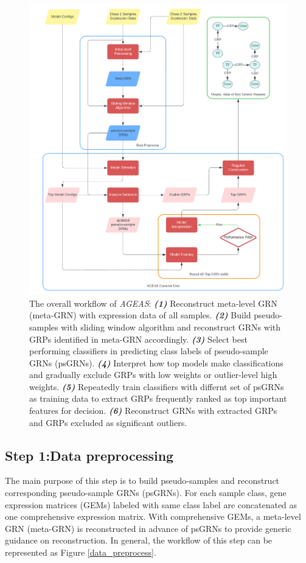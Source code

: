 \documentclass[fleqn,10pt]{wlscirep}
\begin{document}
  \begin{figure}[ht]
  \centering
  \includegraphics[width=0.8\linewidth, keepaspectratio,]{../images/summary_trans.png}
  \caption{
    The overall workflow of \emph{AGEAS}:
    \textbf{\emph{(1)}} Reconstruct meta-level GRN (meta-GRN) with expression data of all samples.
    \textbf{\emph{(2)}} Build pseudo-samples with sliding window algorithm and reconstruct GRNs with GRPs identified in meta-GRN accordingly.
    \textbf{\emph{(3)}} Select best performing classifiers in predicting class labels of pseudo-sample GRNs (psGRNs).
    \textbf{\emph{(4)}} Interpret how top models make classifications and gradually exclude GRPs with low weights or outlier-level high weights.
    \textbf{\emph{(5)}} Repeatedly train classifiers with differnt set of psGRNs as training data to extract GRPs frequently ranked as top important features for decision.
    \textbf{\emph{(6)}} Reconstruct GRNs with extracted GRPs and GRPs excluded as significant outliers.
  }
  \label{workflow}
  \end{figure}

  \subsection*{Step 1:Data preprocessing}
    \label{step1}
    The main purpose of this step is to build pseudo-samples and reconstruct corresponding pseudo-sample GRNs (psGRNs).
    For each sample class, gene expression matrices (GEMs) labeled with same class label are concatenated as one comprehensive expression matrix.
    With comprehensive GEMs, a meta-level GRN (meta-GRN) is reconstructed in advance of psGRNs to provide generic guidance on reconstruction.
    In general, the workflow of this step can be represented as Figure \ref{data_preprocess}.
\end{document}
